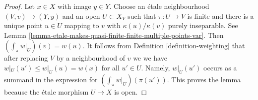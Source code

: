 \documentclass[10pt,a4paper]{amsart}
\theoremstyle{plain}
\theoremstyle{definition}
\theoremstyle{remark}
\numberwithin{equation}{subsection}
\begin{document}
\begin{proof}
Let $x \in X$ with image $y \in Y$. Choose an \'etale neighbourhood
$(V, v) \to (Y, y)$ and an open $U \subset X_V$ such that
$\pi : U \to V$ is finite and there is a unique point $u \in U$
mapping to $v$ with $\kappa(u)/\kappa(v)$ purely inseparable.
See Lemma \ref{lemma-etale-makes-quasi-finite-finite-multiple-points-var}.
Then $(\int_\pi w|_U)(v) = w(u)$.
It follows from Definition \ref{definition-weighting}
that after replacing $V$ by a neighbourhood of $v$ we
we have $w|_U(u') \leq w|_U(u) = w(x)$ for all $u' \in U$.
Namely, $w|_U(u')$ occurs as a summand in the expression
for $(\int_\pi w|_U)(\pi(u'))$.
This proves the lemma because the \'etale morphism
$U \to X$ is open.
\end{proof}
\end{document}
